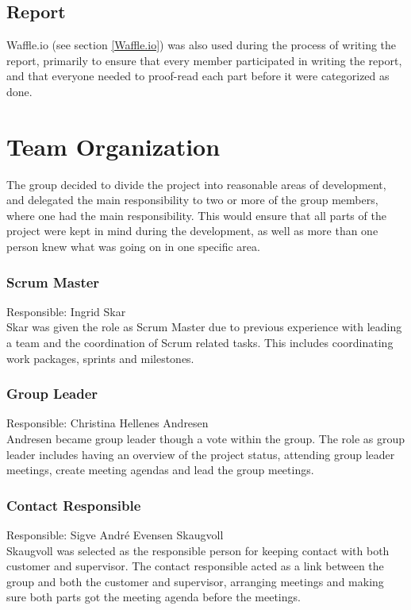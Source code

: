 \subsection{Report}
Waffle.io (see section \ref{Waffle.io}) was also used during the process of writing the report, primarily to ensure that every member participated in writing the report, and that everyone needed to proof-read each part before it were categorized as done.

\section{Team Organization}\label{projectOrganisation}
The group decided to divide the project into reasonable areas of development, and delegated the main responsibility to two or more of the group members, where one had the main responsibility. This would ensure that all parts of the project were kept in mind during the development, as well as more than one person knew what was going on in one specific area.

\subsubsection{Scrum Master}
Responsible: Ingrid Skar \\
Skar was given the role as Scrum Master due to previous experience with leading a team and the coordination of Scrum related tasks. This includes coordinating work packages, sprints and milestones.

\subsubsection{Group Leader}
Responsible: Christina Hellenes Andresen \\
Andresen became group leader though a vote within the group. The role as group leader includes having an overview of the project status, attending group leader meetings, create meeting agendas and lead the group meetings.  

\subsubsection{Contact Responsible}
Responsible: Sigve André Evensen Skaugvoll \\
Skaugvoll was selected as the responsible person for keeping contact with both customer and supervisor. The contact responsible acted as a link between the group and both the customer and supervisor, arranging meetings and making sure both parts got the meeting agenda before the meetings.

